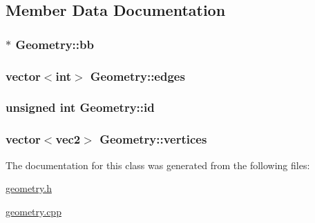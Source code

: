 \subsection{Member Data Documentation}
\hypertarget{class_geometry_ad222ed59c2681a71bd33c6db85c025c2}{
\subsubsection[{bb}]{$\ast$ Geometry\+::bb}}\label{class_geometry_ad222ed59c2681a71bd33c6db85c025c2}
\hypertarget{class_geometry_a81016e7d24d062ea51dd6842ee576c17}{
\subsubsection[{edges}]{\setlength{\rightskip}{0pt plus 5cm}vector$<$int$>$ Geometry\+::edges}}\label{class_geometry_a81016e7d24d062ea51dd6842ee576c17}
\hypertarget{class_geometry_aad8da7cd260eff56d34895126f04b75d}{
\subsubsection[{id}]{\setlength{\rightskip}{0pt plus 5cm}unsigned int Geometry\+::id}}\label{class_geometry_aad8da7cd260eff56d34895126f04b75d}
\hypertarget{class_geometry_a30086a92b88740f2ca9253f708a6639a}{
\subsubsection[{vertices}]{\setlength{\rightskip}{0pt plus 5cm}vector$<$vec2$>$ Geometry\+::vertices}}\label{class_geometry_a30086a92b88740f2ca9253f708a6639a}


The documentation for this class was generated from the following files\+:\begin{DoxyCompactItemize}
\item 
\hyperlink{geometry_8h}{geometry.\+h}\item 
\hyperlink{geometry_8cpp}{geometry.\+cpp}\end{DoxyCompactItemize}
